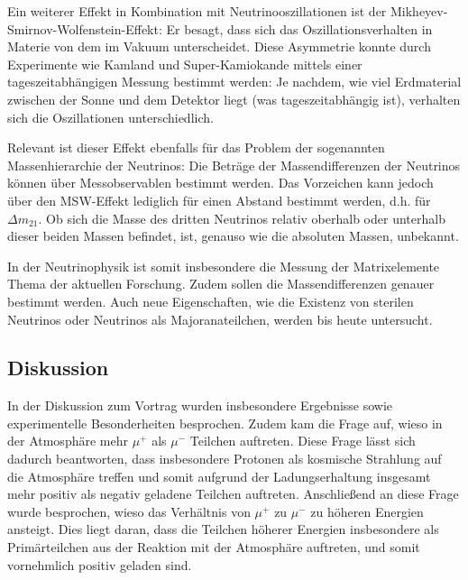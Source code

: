 Ein weiterer Effekt in Kombination mit Neutrinooszillationen ist der Mikheyev-Smirnov-Wolfenstein-Effekt: 
Er besagt, dass sich das Oszillationsverhalten in Materie von dem im Vakuum unterscheidet.
Diese Asymmetrie konnte durch Experimente wie Kamland und Super-Kamiokande mittels einer tageszeitabhängigen Messung bestimmt werden:
Je nachdem, wie viel Erdmaterial zwischen der Sonne und dem Detektor liegt (was tageszeitabhängig ist), verhalten sich die Oszillationen unterschiedlich.

Relevant ist dieser Effekt ebenfalls für das Problem der sogenannten Massenhierarchie der Neutrinos:
Die Beträge der Massendifferenzen der Neutrinos können über Messobservablen bestimmt werden.
Das Vorzeichen kann jedoch über den MSW-Effekt lediglich für einen Abstand bestimmt werden, d.h. für $\Delta m_{21}$. Ob sich die Masse des dritten Neutrinos relativ oberhalb oder unterhalb dieser beiden Massen befindet, ist, genauso wie die absoluten Massen, unbekannt.

In der Neutrinophysik ist somit insbesondere die Messung der Matrixelemente Thema der aktuellen Forschung.
Zudem sollen die Massendifferenzen genauer bestimmt werden.
Auch neue Eigenschaften, wie die Existenz von sterilen Neutrinos oder Neutrinos als Majoranateilchen, werden bis heute untersucht.

\subsection{Diskussion}

In der Diskussion zum Vortrag wurden insbesondere Ergebnisse sowie experimentelle Besonderheiten besprochen.
Zudem kam die Frage auf, wieso in der Atmosphäre mehr $\mu^+$ als $\mu^-$ Teilchen auftreten.
Diese Frage lässt sich dadurch beantworten, dass insbesondere Protonen als kosmische Strahlung auf die Atmosphäre treffen und somit aufgrund der Ladungserhaltung insgesamt mehr positiv als negativ geladene Teilchen auftreten.
Anschließend an diese Frage wurde besprochen, wieso das Verhältnis von $\mu^+$ zu $\mu^-$ zu höheren Energien ansteigt.
Dies liegt daran, dass die Teilchen höherer Energien insbesondere als Primärteilchen aus der Reaktion mit der Atmosphäre auftreten, und somit vornehmlich positiv geladen sind.